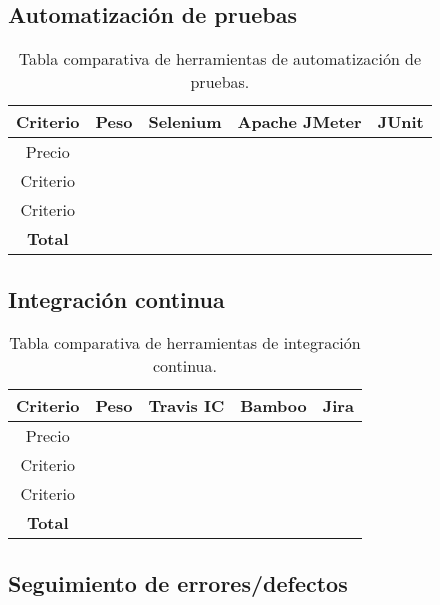 \subsection{Automatización de pruebas}

\begin{table}[H]
	\begin{center}
		\begin{tabular}{|c||c|c|c|c|}
			\hline
			Criterio & Peso & Selenium & Apache JMeter & JUnit \\
			\hline \hline
			Precio &  &  &  &  \\ \hline
			Criterio &  &  &  &  \\ \hline
			Criterio &  &  &  &  \\ \hline
			\textbf{Total} & \textbf{} & \textbf{} & \textbf{} & \textbf{} \\ \hline
		\end{tabular}
		\caption{Tabla comparativa de herramientas de automatización de pruebas.}
		\label{tabla:tabla3}
	\end{center}
\end{table}


\subsection{Integración continua}

\begin{table}[H]
	\begin{center}
		\begin{tabular}{|c||c|c|c|c|}
			\hline
			Criterio & Peso & Travis IC & Bamboo & Jira \\
			\hline \hline
			Precio &  &  &  &  \\ \hline
			Criterio &  &  &  &  \\ \hline
			Criterio &  &  &  &  \\ \hline
			\textbf{Total} & \textbf{} & \textbf{} & \textbf{} & \textbf{} \\ \hline
		\end{tabular}
		\caption{Tabla comparativa de herramientas de integración continua.}
		\label{tabla:tabla4}
	\end{center}
\end{table}


\subsection{Seguimiento de errores/defectos}

